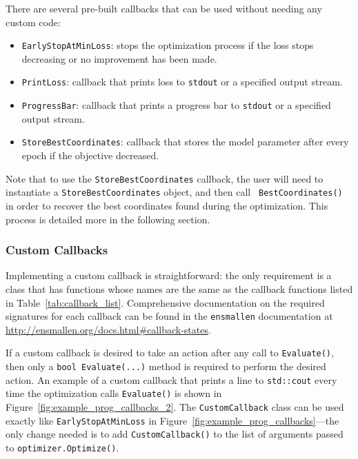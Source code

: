 There are several pre-built callbacks that can be used without
needing any custom code:

\begin{itemize}
  \item {\tt EarlyStopAtMinLoss}: stops the optimization process if the loss
stops decreasing or no improvement has been made.

  \item {\tt PrintLoss}: callback that prints loss to {\tt stdout} or a
specified output stream.

  \item {\tt ProgressBar}: callback that prints a progress bar to {\tt stdout}
or a specified output stream.

  \item {\tt StoreBestCoordinates}: callback that stores the model parameter
after every epoch if the objective decreased.
\end{itemize}

Note that to use the {\tt StoreBestCoordinates} callback, the user will need to
instantiate a {\tt StoreBestCoordinates} object, and then call {\tt
BestCoordinates()} in order to recover the best coordinates found during the
optimization.  This process is detailed more in the following section.

\subsubsection{Custom Callbacks}

Implementing a custom callback is straightforward:
the only requirement is a class that has functions whose names are the same as the callback
functions listed in Table~\ref{tab:callback_list}.
Comprehensive documentation on the required signatures for each callback can be
found in the {\tt ensmallen} documentation at
\url{http://ensmallen.org/docs.html#callback-states}.

If a custom callback is desired to take an action after any call
to {\tt Evaluate()}, then only a {\tt bool Evaluate(...)} method is required
to perform the desired action.
An example of a custom callback that 
prints a line to {\tt std::cout} every time the optimization calls
{\tt Evaluate()} is shown in Figure~\ref{fig:example_prog_callbacks_2}.
The {\tt CustomCallback} class can be used exactly like {\tt EarlyStopAtMinLoss}
in Figure~\ref{fig:example_prog_callbacks}---the only change
needed is to add {\tt CustomCallback()} to the list of arguments passed to
{\tt optimizer.Optimize()}.



